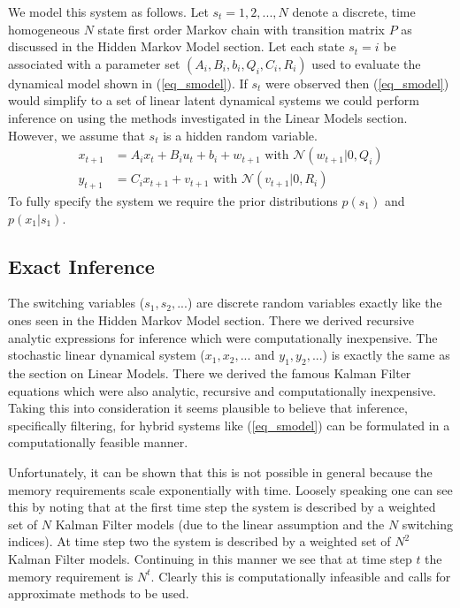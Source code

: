 \documentclass[../masters.tex]{subfiles}
\begin{document}
We model this system as follows. Let $s_t=1,2,..., N$ denote a discrete, time homogeneous $N$ state first order Markov chain with transition matrix $P$ as discussed in the Hidden Markov Model section. Let each state $s_t=i$ be associated with a parameter set $\left(A_i, B_i, b_i, Q_i, C_i, R_i \right)$ used to evaluate the dynamical model shown in (\ref{eq_smodel}). If $s_t$ were observed then (\ref{eq_smodel}) would simplify to a set of linear latent dynamical systems we could perform inference on using the methods investigated in the Linear Models section. However, we assume that $s_t$ is a hidden random variable.
\begin{equation}
\begin{aligned}
x_{t+1} &= A_ix_t + B_iu_t + b_i + w_{t+1} \text{ with } \mathcal{N}(w_{t+1}|0,Q_i) \\
y_{t+1} &= C_ix_{t+1} + v_{t+1}  \text{ with } \mathcal{N}(v_{t+1}|0,R_i)
\end{aligned}
\label{eq_smodel}
\end{equation}
To fully specify the system we require the prior distributions $p(s_1)$ and $p(x_1|s_1)$.

\subsection{Exact Inference}
The switching variables ($s_1, s_2,...$) are discrete random variables exactly like the ones seen in the Hidden Markov Model section. There we derived recursive analytic expressions for inference which were computationally inexpensive. The stochastic linear dynamical system ($x_1,x_2,...$ and $y_1, y_2,...$) is exactly the same as the section on Linear Models. There we derived the famous Kalman Filter equations which were also analytic, recursive and computationally inexpensive. Taking this into consideration it seems plausible to believe that inference, specifically filtering, for hybrid systems like (\ref{eq_smodel}) can be formulated in a computationally feasible manner. 

Unfortunately, it can be shown that this is not possible in general \cite{lerner}\cite{murphy3} because the memory requirements scale exponentially with time. Loosely speaking one can see this by noting that at the first time step the system is described by a weighted set of $N$ Kalman Filter models (due to the linear assumption and the $N$ switching indices). At time step two the system is described by a weighted set of $N^2$ Kalman Filter models. Continuing in this manner we see that at time step $t$ the memory requirement is $N^t$. Clearly this is computationally infeasible and calls for approximate methods to be used. 
\end{document}
